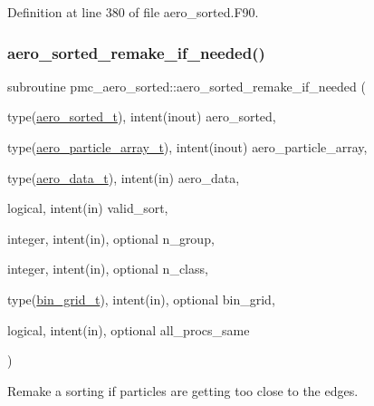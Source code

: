 Definition at line 380 of file aero\+\_\+sorted.\+F90.

\mbox{\label{namespacepmc__aero__sorted_a7d7a0e73c0725fe40ed2ec64c16455db}} 
\subsubsection{\texorpdfstring{aero\+\_\+sorted\+\_\+remake\+\_\+if\+\_\+needed()}{aero\_sorted\_remake\_if\_needed()}}
{\footnotesize\ttfamily subroutine pmc\+\_\+aero\+\_\+sorted\+::aero\+\_\+sorted\+\_\+remake\+\_\+if\+\_\+needed (\begin{DoxyParamCaption}\item[{type(\mbox{\hyperlink{structpmc__aero__sorted_1_1aero__sorted__t}{aero\+\_\+sorted\+\_\+t}}), intent(inout)}]{aero\+\_\+sorted,  }\item[{type(\mbox{\hyperlink{structpmc__aero__particle__array_1_1aero__particle__array__t}{aero\+\_\+particle\+\_\+array\+\_\+t}}), intent(inout)}]{aero\+\_\+particle\+\_\+array,  }\item[{type(\mbox{\hyperlink{structpmc__aero__data_1_1aero__data__t}{aero\+\_\+data\+\_\+t}}), intent(in)}]{aero\+\_\+data,  }\item[{logical, intent(in)}]{valid\+\_\+sort,  }\item[{integer, intent(in), optional}]{n\+\_\+group,  }\item[{integer, intent(in), optional}]{n\+\_\+class,  }\item[{type(\mbox{\hyperlink{structpmc__bin__grid_1_1bin__grid__t}{bin\+\_\+grid\+\_\+t}}), intent(in), optional}]{bin\+\_\+grid,  }\item[{logical, intent(in), optional}]{all\+\_\+procs\+\_\+same }\end{DoxyParamCaption})}



Remake a sorting if particles are getting too close to the edges. 


